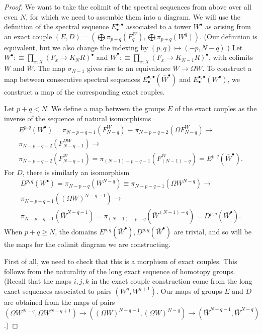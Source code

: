 \documentclass{amsart}
\theoremstyle{definition}
\newcommand{\depfun}[2]{\prod\limits_{#1}^{}{#2}}
\begin{document}
\begin{proof}
    We want to take the colimit of the spectral sequences from above over all even $N$, for which we need to assemble them into a diagram. We will use the definition of the spectral sequence $E_\bullet^{\bullet, \bullet}$ associated to a tower $W^\bullet$ as arising from an exact couple $(E, D) = (\bigoplus \pi_{p+q}(F_q^W), \bigoplus \pi_{p+q}(W^q))$. (Our definition is equivalent, but we also change the indexing by $(p,q) \mapsto (-p, N-q)$.) Let $W^\bullet :\equiv \depfun{x:X}{(F_x \to K_NR)^\bullet}$ and $\bar{W}^\bullet  :\equiv \depfun{x:X}{(F_x \to K_{N-1}R)^\bullet}$, with colimits $W$ and $\bar{W}$. The map $\sigma_{N-1}$ gives rise to an equivalence $\bar{W} \to \Omega W$. To construct a map between consecutive spectral sequences $E^{\bullet, \bullet}_{\bullet}(\bar{W}^{\bullet})$ and $E^{\bullet, \bullet}_{\bullet}({W}^{\bullet})$, we construct a map of the corresponding exact couples.

    Let $p+q < N$. We define a map between the groups $E$ of the exact couples as the inverse of the sequence of natural isomorphisms
    \begin{align*}
        E^{p,q}(W^\bullet) =
        \pi_{N-p-q-1}(F^W_{N-q}) \equiv\pi_{N-p-q-2}(\Omega F^W_{N-q}) \to \\
        \pi_{N-p-q-2}(F^{\Omega W}_{N-q-1}) \to \\
        \pi_{N-p-q-2}(F^{\bar{W}}_{N-q-1}) =
        \pi_{(N-1)-p-q-1}(F^{\bar{W}}_{(N-1)-q})
        = E^{p,q}(\bar{W}^\bullet).
    \end{align*}
    For $D$, there is similarly an isomorphism
    \begin{align*}
        D^{p,q}(W^\bullet) = \pi_{N-p-q}(W^{N-q}) \equiv \pi_{N-p-q-1}(\Omega W^{N-q}) \to \\
        \pi_{N-p-q-1}((\Omega W)^{N-q-1}) \to \\
        \pi_{N-p-q-1}(\bar{W}^{N-q-1}) =
        \pi_{(N-1)-p-q}(\bar{W}^{(N-1)-q}) = D^{p,q}(\bar{W}^\bullet).
    \end{align*}
    When $p+q \geq N$, the domains $E^{p,q}(\bar{W}^\bullet), D^{p,q}(\bar{W}^\bullet)$ are trivial, and so will be the maps for the colimit diagram we are constructing.

    First of all, we need to check that this is a morphism of exact couples. This follows from the naturality of the long exact sequence of homotopy groups. (Recall that the maps $i,j,k$ in the exact couple construction come from the long exact sequences associated to pairs $(W^q, W^{q+1})$. Our maps of groups $E$ and $D$ are obtained from the maps of pairs $(\Omega W^{N-q}, \Omega W^{N-q+1}) \to ( {(\Omega W)}^{N-q-1},  {(\Omega W)}^{N-q}) \to ({\bar{W}}^{N-q-1}, {\bar{W}}^{N-q})$.)


\end{proof}
\end{document}
